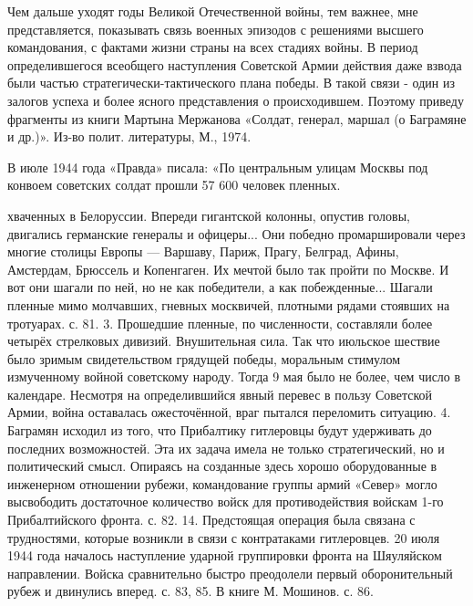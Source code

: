 \label{2-2}
Чем дальше уходят годы Великой Отечественной войны, тем важнее, мне представляется, показывать связь военных эпизодов с решениями высшего командования, с фактами жизни страны на всех стадиях войны. В период определившегося всеобщего наступления Советской Армии действия даже взвода были частью стратегически-тактического плана победы. В такой связи - один из залогов успеха и более ясного представления о происходившем. Поэтому приведу фрагменты из книги Мартына Мержанова «Солдат, генерал, маршал (о Баграмяне и др.)». Из-во полит. литературы, М., 1974.

\label{2-3}
В июле 1944 года «Правда» писала: «По центральным улицам Москвы под конвоем советских солдат прошли 57 600 человек пленных.

\label{3-1}
хваченных в Белоруссии. Впереди гигантской колонны, опустив головы, двигались германские генералы и офицеры... Они победно промаршировали через многие столицы Европы — Варшаву, Париж, Прагу, Белград, Афины, Амстердам, Брюссель и Копенгаген. Их мечтой было так пройти по Москве. И вот они шагали по ней, но не как победители, а как побежденные... Шагали пленные мимо молчавших, гневных москвичей, плотными рядами стоявших на тротуарах. с. 81. 3. Прошедшие пленные, по численности, составляли более четырёх стрелковых дивизий. Внушительная сила. Так что июльское шествие было зримым свидетельством грядущей победы, моральным стимулом измученному войной советскому народу. Тогда 9 мая было не более, чем число в календаре. Несмотря на определившийся явный перевес в пользу Советской Армии, война оставалась ожесточённой, враг пытался переломить ситуацию. 4. Баграмян исходил из того, что Прибалтику гитлеровцы будут удерживать до последних возможностей. Эта их задача имела не только стратегический, но и политический смысл. Опираясь на созданные здесь хорошо оборудованные в инженерном отношении рубежи, командование группы армий «Север» могло высвободить достаточное количество войск для противодействия войскам 1-го Прибалтийского фронта. с. 82. 14. Предстоящая операция была связана с трудностями, которые возникли в связи с контратаками гитлеровцев. 20 июля 1944 года началось наступление ударной группировки фронта на Шяуляйском направлении. Войска сравнительно быстро преодолели первый оборонительный рубеж и двинулись вперед. с. 83, 85. В книге М. Мошинов. с. 86.

